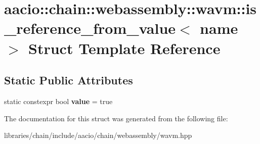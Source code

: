 \hypertarget{structaacio_1_1chain_1_1webassembly_1_1wavm_1_1is__reference__from__value_3_01name_01_4}{}\section{aacio\+:\+:chain\+:\+:webassembly\+:\+:wavm\+:\+:is\+\_\+reference\+\_\+from\+\_\+value$<$ name $>$ Struct Template Reference}
\label{structaacio_1_1chain_1_1webassembly_1_1wavm_1_1is__reference__from__value_3_01name_01_4}
\subsection*{Static Public Attributes}
\begin{DoxyCompactItemize}
\item 
\mbox{\label{structaacio_1_1chain_1_1webassembly_1_1wavm_1_1is__reference__from__value_3_01name_01_4_ab23b2cc5452390cfc0dd6a7d814af623}} 
static constexpr bool {\bfseries value} = true
\end{DoxyCompactItemize}


The documentation for this struct was generated from the following file\+:\begin{DoxyCompactItemize}
\item 
libraries/chain/include/aacio/chain/webassembly/wavm.\+hpp\end{DoxyCompactItemize}
